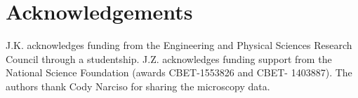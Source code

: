\documentclass[a4paper,11pt]{article}
\newcommand{\invivo}{\textit{in vivo}~}
\begin{document}


\section*{Acknowledgements}

J.K. acknowledges funding from the Engineering and Physical Sciences Research Council through a studentship. J.Z. acknowledges funding support from the National Science Foundation (awards CBET-1553826 and CBET- 1403887). The authors thank Cody Narciso for sharing the microscopy data.

\end{document}
